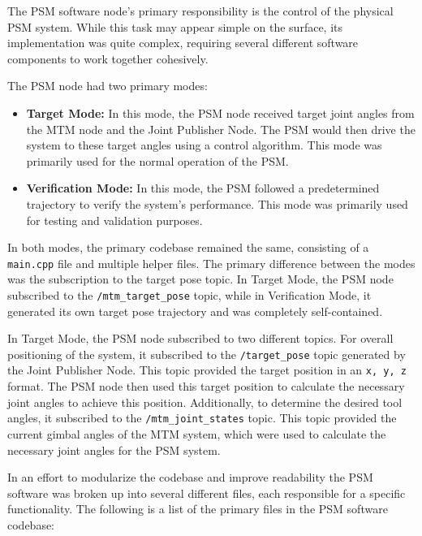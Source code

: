 The PSM software node's primary responsibility is the control of the physical PSM system. While this task may appear simple on the surface, its implementation was quite complex, requiring several different software components to work together cohesively.

The PSM node had two primary modes:

\begin{itemize}
    \item \textbf{Target Mode:} In this mode, the PSM node received target joint angles from the MTM node and the Joint Publisher Node. The PSM would then drive the system to these target angles using a control algorithm. This mode was primarily used for the normal operation of the PSM.
    \item \textbf{Verification Mode:} In this mode, the PSM followed a predetermined trajectory to verify the system's performance. This mode was primarily used for testing and validation purposes.
\end{itemize}

In both modes, the primary codebase remained the same, consisting of a \texttt{main.cpp} file and multiple helper files. The primary difference between the modes was the subscription to the target pose topic. In Target Mode, the PSM node subscribed to the \texttt{/mtm\_target\_pose} topic, while in Verification Mode, it generated its own target pose trajectory and was completely self-contained.

In Target Mode, the PSM node subscribed to two different topics. For overall positioning of the system, it subscribed to the \texttt{/target\_pose} topic generated by the Joint Publisher Node. This topic provided the target position in an \texttt{x, y, z} format. The PSM node then used this target position to calculate the necessary joint angles to achieve this position. Additionally, to determine the desired tool angles, it subscribed to the \texttt{/mtm\_joint\_states} topic. This topic provided the current gimbal angles of the MTM system, which were used to calculate the necessary joint angles for the PSM system.

In an effort to modularize the codebase and improve readability the PSM software was broken up into several different files, each responsible for a specific functionality. The following is a list of the primary files in the PSM software codebase:

